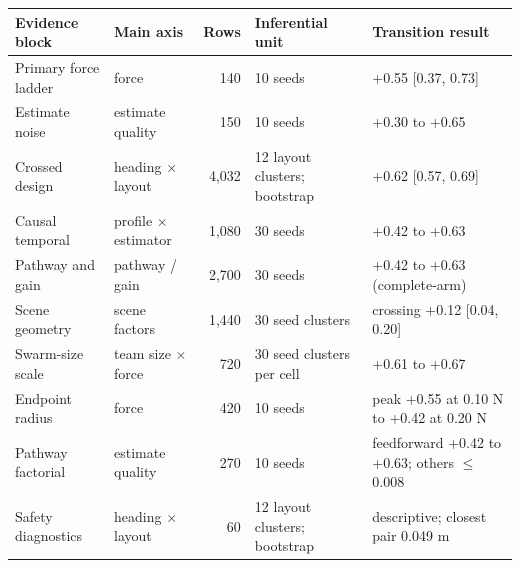 \begingroup
\setlength{\tabcolsep}{3pt}
\begin{tabular}{@{}p{1.30in}p{1.15in}r p{1.15in}p{2.05in}@{}}
\toprule
Evidence block & Main axis & Rows & Inferential unit & Transition result \\
\midrule
Primary force ladder & force &   140 & 10 seeds & +0.55 [0.37, 0.73] \\
Estimate noise & estimate quality &   150 & 10 seeds & +0.30 to +0.65 \\
Crossed design & heading $\times$ layout & 4,032 & 12 layout clusters; bootstrap & +0.62 [0.57, 0.69] \\
Causal temporal & profile $\times$ estimator & 1,080 & 30 seeds & +0.42 to +0.63 \\
Pathway and gain & pathway / gain & 2,700 & 30 seeds & +0.42 to +0.63 (complete-arm) \\
Scene geometry & scene factors & 1,440 & 30 seed clusters & crossing +0.12 [0.04, 0.20] \\
Swarm-size scale & team size $\times$ force &   720 & 30 seed clusters per cell & +0.61 to +0.67 \\
Endpoint radius & force &   420 & 10 seeds & peak +0.55 at 0.10 N to +0.42 at 0.20 N \\
Pathway factorial & estimate quality &   270 & 10 seeds & feedforward +0.42 to +0.63; others $\le$ 0.008 \\
Safety diagnostics & heading $\times$ layout &    60 & 12 layout clusters; bootstrap & descriptive; closest pair 0.049 m \\
\bottomrule
\end{tabular}
\endgroup
